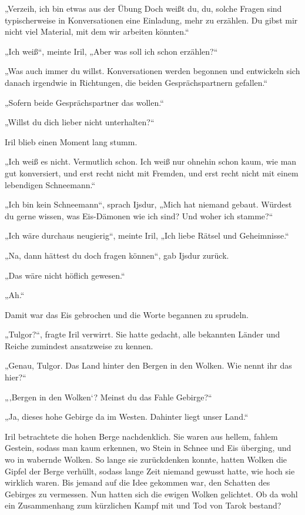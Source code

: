 „Verzeih, ich bin etwas aus der Übung Doch weißt du, du, solche Fragen sind typischerweise in Konversationen eine Einladung, mehr zu erzählen. Du gibst mir nicht viel Material, mit dem wir arbeiten könnten.“

„Ich weiß“, meinte Iril, „Aber was soll ich schon erzählen?“

„Was auch immer du willst. Konversationen werden begonnen und entwickeln sich danach irgendwie in Richtungen, die beiden Gesprächspartnern gefallen.“

„Sofern beide Gesprächspartner das wollen.“

„Willst du dich lieber nicht unterhalten?“

Iril blieb einen Moment lang stumm.

„Ich weiß es nicht. Vermutlich schon. Ich weiß nur ohnehin schon kaum, wie man gut konversiert, und erst recht nicht mit Fremden, und erst recht nicht mit einem lebendigen Schneemann.“

„Ich bin kein Schneemann“, sprach Ijsdur, „Mich hat niemand gebaut. Würdest du gerne wissen, was Eis-Dämonen wie ich sind? Und woher ich stamme?“

„Ich wäre durchaus neugierig“, meinte Iril, „Ich liebe Rätsel und Geheimnisse.“

„Na, dann hättest du doch fragen können“, gab Ijsdur zurück.

„Das wäre nicht höflich gewesen.“

„Ah.“

Damit war das Eis gebrochen und die Worte begannen zu sprudeln.



\trennzeichen



„Tulgor?“, fragte Iril verwirrt. Sie hatte gedacht, alle bekannten Länder und Reiche zumindest ansatzweise zu kennen.

„Genau, Tulgor. Das Land hinter den Bergen in den Wolken. Wie nennt ihr das hier?“

„‚Bergen in den Wolken‘? Meinst du das Fahle Gebirge?“

„Ja, dieses hohe Gebirge da im Westen. Dahinter liegt unser Land.“

Iril betrachtete die hohen Berge nachdenklich. Sie waren aus hellem, fahlem Gestein, sodass man kaum erkennen, wo Stein in Schnee und Eis überging, und wo in wabernde Wolken. So lange sie zurückdenken konnte, hatten Wolken die Gipfel der Berge verhüllt, sodass lange Zeit niemand gewusst hatte, wie hoch sie wirklich waren. Bis jemand auf die Idee gekommen war, den Schatten des Gebirges zu vermessen. Nun hatten sich die ewigen Wolken gelichtet. Ob da wohl ein Zusammenhang zum kürzlichen Kampf mit und Tod von Tarok bestand?

